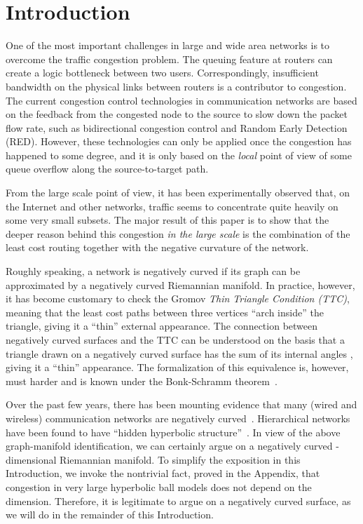 \documentclass{article}
\begin{document}
\noindent 
\section{Introduction}

One of the most important challenges in large and wide area networks is to overcome the traffic congestion problem. The queuing feature at routers can create a logic bottleneck between two users. Correspondingly, insufficient bandwidth on the physical links between routers is a contributor to congestion. The current congestion control technologies in communication networks are based on the feedback from the congested node to the source to slow down the packet flow rate, such as bidirectional congestion control and Random Early Detection (RED). However, these technologies can only be applied once the congestion has happened to some degree, and it is only based on the \textit{local} point of view of some queue overflow along the source-to-target path. 

From the large scale point of view, it has been experimentally observed that, on the Internet and other networks, traffic seems to concentrate quite heavily on some very small subsets. The major result of this paper is to show that the deeper reason behind this congestion \textit{in the large scale} is the combination of the least cost routing together with the negative curvature of the network. 

Roughly speaking, a network is negatively curved if its graph can be approximated by a negatively curved Riemannian manifold. In practice, however, it has become customary to check the Gromov   \textit{Thin Triangle Condition (TTC)}, meaning that the least cost paths between three vertices ``arch inside'' the triangle, giving it a ``thin'' external appearance. The connection between negatively curved surfaces and the TTC can be understood on the basis that a triangle drawn on a negatively curved surface has the sum of its internal angles , giving it a ``thin'' appearance. The formalization of this equivalence is, however, must harder and is known under the Bonk-Schramm theorem~\cite{bonk_schramm}. 

Over the past few years, there has been mounting evidence that many (wired and wireless) communication networks are negatively curved~\cite{Matt_thesis,scaled_gromov,JonckheereLohsoonthornACC2004,JonckheereLohsoonthornMED2002}. Hierarchical networks have been found to have ``hidden hyperbolic structure''~\cite{dima_hidden_hyperbolic}. In view of the above graph-manifold identification, we can certainly argue on a negatively curved -dimensional Riemannian manifold. To simplify the exposition in this Introduction, we invoke the nontrivial fact, proved in the Appendix, that congestion in very large hyperbolic ball models does not depend on the dimension. Therefore, it is legitimate to argue on a negatively curved surface, as we will do in the remainder of this Introduction.  
\end{document}
